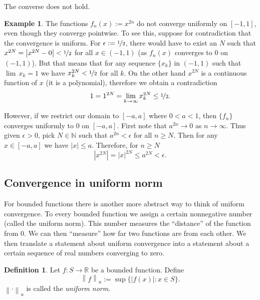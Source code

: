 \documentclass[12pt]{book}
\newcommand{\abs}[1]{\left\lvert {#1} \right\rvert}
\newcommand{\norm}[1]{\left\lVert {#1} \right\rVert}
\newcommand{\R}{{\mathbb{R}}}
\newcommand{\N}{{\mathbb{N}}}
\newcommand{\myindex}[1]{#1\index{#1}}
\theoremstyle{plain}
\theoremstyle{remark}
\theoremstyle{definition}
\newtheorem{defn}[thm]{Definition}
\theoremstyle{exercise}
\theoremstyle{example}
\newtheorem{example}[thm]{Example}
\begin{document}
The converse does not hold.

\begin{example}
The functions $f_n(x) := x^{2n}$ do not converge uniformly on $[-1,1]$,
even though they converge pointwise.  To see this, suppose for contradiction
that the convergence is uniform.  For $\epsilon := \nicefrac{1}{2}$, there would have
to exist an $N$ such that $x^{2N} = \abs{x^{2N} - 0} < \nicefrac{1}{2}$ for all $x \in
(-1,1)$ (as $f_n(x)$ converges to 0 on $(-1,1)$).  But that means that
for any sequence $\{ x_k \}$ in $(-1,1)$ such that $\lim\, x_k = 1$
we have $x_k^{2N} < \nicefrac{1}{2}$ for all $k$.  On the other hand
$x^{2N}$ is a continuous function of $x$ (it is a polynomial), therefore
we obtain a contradiction
\begin{equation*}
1 = 1^{2N}  = \lim_{k\to\infty} x_k^{2N} \leq \nicefrac{1}{2} .
\end{equation*}

However, if we restrict our domain to $[-a,a]$ where $0 < a < 1$, then
$\{ f_n \}$ converges uniformly to 0 on $[-a,a]$.  First note
that $a^{2n} \to 0$ as $n \to \infty$.  Thus given $\epsilon > 0$,
pick $N \in \N$ such that
$a^{2n} < \epsilon$ for all $n \geq N$.  Then for any $x \in [-a,a]$
we have $\abs{x} \leq a$.  Therefore, for $n \geq N$
\begin{equation*}
\abs{x^{2N}} = \abs{x}^{2N} \leq a^{2N} < \epsilon .
\end{equation*}
\end{example}

\subsection{Convergence in uniform norm}

For bounded functions there is another more abstract way to 
think of uniform convergence.  To every bounded function we assign
a certain nonnegative number (called the uniform norm).  This number
measures the ``distance'' of the function from 0.  We can then ``measure''
how far two functions are from each other.  We then translate
a statement about uniform convergence into a statement about a certain
sequence of real numbers converging to zero.

\begin{defn} \label{def:unifnorm}
Let $f \colon S \to \R$ be a bounded function.  Define
\begin{equation*}
\norm{f}_u :=
\sup \bigl\{ \abs{f(x)} : x \in S \bigr\} .
\end{equation*}
$\norm{\cdot}_u$ is called the \emph{\myindex{uniform norm}}.
\end{defn}
\end{document}
